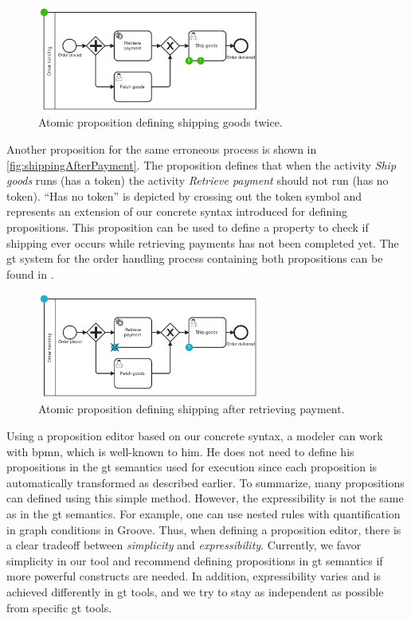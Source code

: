 \documentclass{lmcs} %
\theoremstyle{plain}\newtheorem{satz}[thm]{Satz} %
\begin{document}
\begin{figure}[ht]
    \centering
    \includegraphics[width=0.65\textwidth]{images/shippedTwiceProposition.pdf}
    \caption{Atomic proposition defining shipping goods twice.}
    \label{fig:shippedTwiceProposition}
\end{figure}

Another proposition for the same erroneous process is shown in \autoref{fig:shippingAfterPayment}.
The proposition defines that when the activity \textit{Ship goods} runs (has a token) the activity \textit{Retrieve payment} should not run (has no token).
\enquote{Has no token} is depicted by crossing out the token symbol and represents an extension of our concrete syntax introduced for defining propositions.
This proposition can be used to define a property to check if shipping ever occurs while retrieving payments has not been completed yet.
The \gls*{gt} system for the order handling process containing both propositions can be found in \cite{krauterArtifactsLMCS2023}.

\begin{figure}[ht]
    \centering
    \includegraphics[width=0.65\textwidth]{images/shippingAfterPayment.pdf}
    \caption{Atomic proposition defining shipping after retrieving payment.}
    \label{fig:shippingAfterPayment}
\end{figure}

Using a proposition editor based on our concrete syntax, a modeler can work with \gls*{bpmn}, which is well-known to him.
He does not need to define his propositions in the \gls*{gt} semantics used for execution since each proposition is automatically transformed as described earlier.
To summarize, many propositions can defined using this simple method.
However, the expressibility is not the same as in the \gls*{gt} semantics.
For example, one can use nested rules with quantification in graph conditions in Groove.
Thus, when defining a proposition editor, there is a clear tradeoff between \textit{simplicity} and \textit{expressibility}.
Currently, we favor simplicity in our tool and recommend defining propositions in \gls*{gt} semantics if more powerful constructs are needed.
In addition, expressibility varies and is achieved differently in \gls*{gt} tools, and we try to stay as independent as possible from specific \gls*{gt} tools.
\end{document}
